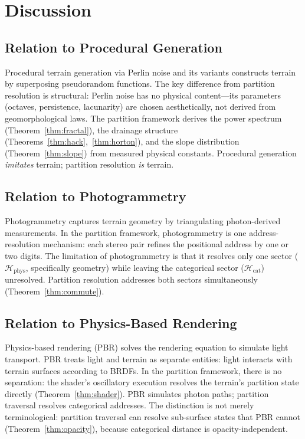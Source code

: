 \documentclass[10pt,twocolumn]{article}
\theoremstyle{definition}
\theoremstyle{remark}
\newcommand{\Hil}{\mathcal{H}}
\begin{document}
\section{Discussion}\label{sec:discussion}

\subsection{Relation to Procedural Generation}

Procedural terrain generation via Perlin noise
\citep{Perlin1985} and its variants constructs terrain by
superposing pseudorandom functions.  The key difference from
partition resolution is structural: Perlin noise has no
physical content---its parameters (octaves, persistence,
lacunarity) are chosen aesthetically, not derived from
geomorphological laws.  The partition framework derives the
power spectrum (Theorem~\ref{thm:fractal}), the drainage
structure (Theorems~\ref{thm:hack},~\ref{thm:horton}), and
the slope distribution (Theorem~\ref{thm:slope}) from measured
physical constants.  Procedural generation \emph{imitates}
terrain; partition resolution \emph{is} terrain.

\subsection{Relation to Photogrammetry}

Photogrammetry captures terrain geometry by triangulating
photon-derived measurements.  In the partition framework,
photogrammetry is one address-resolution mechanism: each
stereo pair refines the positional address by one or two
digits.  The limitation of photogrammetry is that it resolves
only one sector ($\Hil_{\mathrm{phys}}$, specifically
geometry) while leaving the categorical sector
($\Hil_{\mathrm{cat}}$) unresolved.  Partition resolution
addresses both sectors simultaneously
(Theorem~\ref{thm:commute}).

\subsection{Relation to Physics-Based Rendering}

Physics-based rendering (PBR) \citep{Pharr2016} solves the
rendering equation \citep{Kajiya1986} to simulate light
transport.  PBR treats light and terrain as separate entities:
light interacts with terrain surfaces according to BRDFs.  In
the partition framework, there is no separation: the shader's
oscillatory execution resolves the terrain's partition state
directly (Theorem~\ref{thm:shader}).  PBR simulates photon
paths; partition traversal resolves categorical addresses.  The
distinction is not merely terminological: partition traversal
can resolve sub-surface states that PBR cannot
(Theorem~\ref{thm:opacity}), because categorical distance is
opacity-independent.
\end{document}
